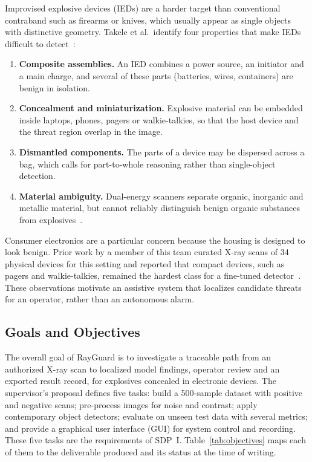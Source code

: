 Improvised explosive devices (IEDs) are a harder target than conventional
contraband such as firearms or knives, which usually appear as single objects
with distinctive geometry. Takele et al.\ identify four properties that make IEDs
difficult to detect~\citep{takele2026iedxray}:
\begin{enumerate}
\item \textbf{Composite assemblies.} An IED combines a power source, an initiator
and a main charge, and several of these parts (batteries, wires, containers) are
benign in isolation.
\item \textbf{Concealment and miniaturization.} Explosive material can be embedded
inside laptops, phones, pagers or walkie-talkies, so that the host device and the
threat region overlap in the image.
\item \textbf{Dismantled components.} The parts of a device may be dispersed across
a bag, which calls for part-to-whole reasoning rather than single-object detection.
\item \textbf{Material ambiguity.} Dual-energy scanners separate organic, inorganic
and metallic material, but cannot reliably distinguish benign organic substances
from explosives~\citep{wells2012review}.
\end{enumerate}
Consumer electronics are a particular concern because the housing is designed to
look benign. Prior work by a member of this team curated X-ray scans of 34
physical devices for this setting and reported that compact devices, such as pagers
and walkie-talkies, remained the hardest class for a fine-tuned
detector~\citep{ismaik2026src}. These observations motivate an assistive system
that localizes candidate threats for an operator, rather than an autonomous
alarm.

\subsection{Goals and Objectives}
The overall goal of RayGuard is to investigate a traceable path from an authorized
X-ray scan to localized model findings, operator review and an exported result
record, for explosives concealed in electronic devices. The supervisor's
proposal defines five tasks: build a 500-sample dataset with positive and
negative scans; pre-process images for noise and contrast; apply contemporary
object detectors; evaluate on unseen test data with several metrics; and provide
a graphical user interface (GUI) for system control and recording. These five
tasks are the requirements of SDP~I. Table~\ref{tab:objectives} maps each of them
to the deliverable produced and its status at the time of writing.


